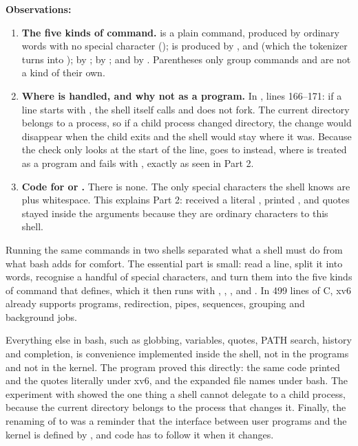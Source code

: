 \documentclass[11pt,a4paper]{article}
\begin{document}
\textbf{Observations:}
\begin{enumerate}
  \item \textbf{The five kinds of command.}  is a plain command, produced by
  ordinary words with no special character ();  is produced by
  \code{<}, \code{>} and \code{>>} (which the tokenizer turns into \code{+});  by
  \code{|};  by \code{;}; and  by \code{\&}. Parentheses only group
  commands and are not a kind of their own.
  \item \textbf{Where  is handled, and why not as a program.} In , lines
  166--171: if a line starts with , the shell itself calls  and does not
  fork. The current directory belongs to a process, so if a child process changed directory,
  the change would disappear when the child exits and the shell would stay where it was. Because
  the check only looks at the start of the line,  goes to
   instead, where  is treated as a program and fails with
  , exactly as seen in Part 2.
  \item \textbf{Code for \code{*} or \code{\$}.} There is none. The only special characters
  the shell knows are  plus whitespace. This explains Part 2:
   received a literal \code{*},  printed , and
  quotes stayed inside the arguments because they are ordinary characters to this shell.
\end{enumerate}


Running the same commands in two shells separated what a shell must do from what bash adds for
comfort. The essential part is small: read a line, split it into words, recognise a handful of
special characters, and turn them into the five kinds of command that  defines,
which it then runs with , , ,  and .
In 499 lines of C, xv6 already supports programs, redirection, pipes, sequences, grouping and
background jobs.

Everything else in bash, such as globbing, variables, quotes, PATH search, history and
completion, is convenience implemented inside the shell, not in the programs and not in the
kernel. The  program proved this directly: the same code printed  and the
quotes literally under xv6, and the expanded file names under bash. The experiment with
 showed the one thing a shell cannot delegate to a child process, because the current
directory belongs to the process that changes it. Finally, the renaming of  to
 was a reminder that the interface between user programs and the kernel is defined
by , and code has to follow it when it changes.
\end{document}
